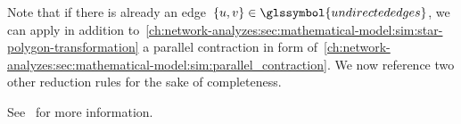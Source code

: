 Note that if there is already an
edge~$\{\vertexa,\vertexb\}\in\glssymbol{undirectededges}$, we can apply in
addition
to~\cref{ch:network-analyzes:sec:mathematical-model:sim:star-polygon-transformation}
a parallel contraction in form
of~\cref{ch:network-analyzes:sec:mathematical-model:sim:parallel_contraction}.
We now reference two other reduction rules for the sake of completeness.
%
\begin{reductionrule}
    See~\textcite{Sat85} for more information.
    \label{ch:network-analyzes:sec:mathematical-model:sim:polygon_to_chain_reduction}
\end{reductionrule}
% 

